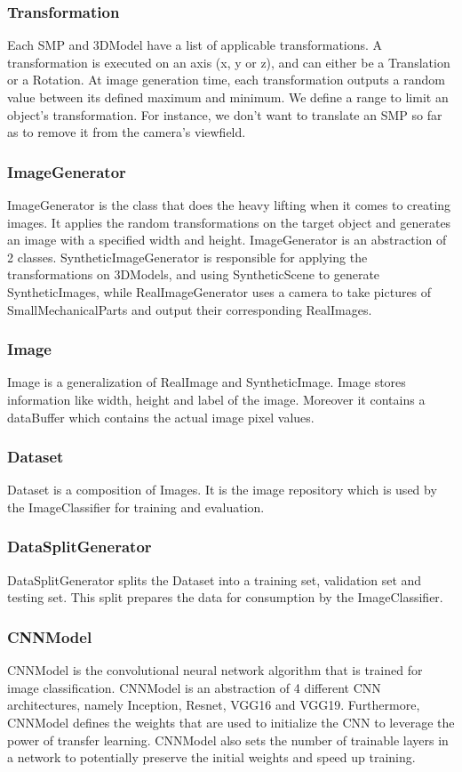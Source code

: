 \documentclass[a4paper,12pt,twoside]{report}
\begin{document}
\subsubsection{Transformation}
Each SMP and 3DModel have a list of applicable transformations. A transformation is executed on an axis (x, y or z), and can either be a Translation or a Rotation.
At image generation time, each transformation outputs a random value between its defined maximum and minimum. We define a range to limit an object's transformation. For instance, we don't want to translate an SMP so far as to remove it from the camera's viewfield.

\subsubsection{ImageGenerator}
ImageGenerator is the class that does the heavy lifting when it comes to creating images. It applies the random transformations on the target object and generates an image with a specified width and height.
ImageGenerator is an abstraction of 2 classes. SyntheticImageGenerator is responsible for applying the transformations on 3DModels, and using SyntheticScene to generate SyntheticImages, while RealImageGenerator uses a camera to take pictures of SmallMechanicalParts and output their corresponding RealImages.

\subsubsection{Image}
Image is a generalization of RealImage and SyntheticImage. Image stores information like width, height and label of the image. Moreover it contains a dataBuffer which contains the actual image pixel values.

\subsubsection{Dataset}
Dataset is a composition of Images. It is the image repository which is used by the ImageClassifier for training and evaluation.

\subsubsection{DataSplitGenerator}
DataSplitGenerator splits the Dataset into a training set, validation set and testing set. This split prepares the data for consumption by the ImageClassifier.

\subsubsection{CNNModel}
CNNModel is the convolutional neural network algorithm that is trained for image classification. CNNModel is an abstraction of 4 different CNN architectures, namely Inception, Resnet, VGG16 and VGG19. Furthermore, CNNModel defines the weights that are used to initialize the CNN to leverage the power of transfer learning. CNNModel also sets the number of trainable layers in a network to potentially preserve the initial weights and speed up training.
\end{document}
